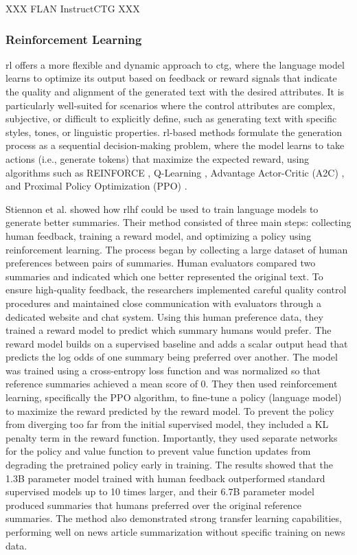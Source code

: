 XXX
FLAN
InstructCTG
XXX

\subsubsection{Reinforcement Learning}
\gls{rl} offers a more flexible and dynamic approach to \gls{ctg}, where the language model learns to optimize its output based on feedback or reward signals that indicate the quality and alignment of the generated text with the desired attributes. 
It is particularly well-suited for scenarios where the control attributes are complex, subjective, or difficult to explicitly define, such as generating text with specific styles, tones, or linguistic properties. 
\gls{rl}-based methods formulate the generation process as a sequential decision-making problem, where the model learns to take actions (i.e., generate tokens) that maximize the expected reward, using algorithms such as REINFORCE \cite{10.1007/BF00992696}, Q-Learning \cite{Watkins1992-pa}, Advantage Actor-Critic (A2C) \cite{mnih2016asynchronousmethodsdeepreinforcement}, and Proximal Policy Optimization (PPO) \cite{schulman2017proximalpolicyoptimizationalgorithms}.

Stiennon et al. \Cite{stiennon2022learningsummarizehumanfeedback} showed how \gls{rlhf} could be used to train language models to generate better summaries.
Their method consisted of three main steps: collecting human feedback, training a reward model, and optimizing a policy using reinforcement learning.
The process began by collecting a large dataset of human preferences between pairs of summaries. 
Human evaluators compared two summaries and indicated which one better represented the original text. To ensure high-quality feedback, the researchers implemented careful quality control procedures and maintained close communication with evaluators through a dedicated website and chat system.
Using this human preference data, they trained a reward model to predict which summary humans would prefer. 
The reward model builds on a supervised baseline and adds a scalar output head that predicts the log odds of one summary being preferred over another.
The model was trained using a cross-entropy loss function and was normalized so that reference summaries achieved a mean score of 0.
They then used reinforcement learning, specifically the PPO algorithm, to fine-tune a policy (language model) to maximize the reward predicted by the reward model. 
To prevent the policy from diverging too far from the initial supervised model, they included a KL penalty term in the reward function. 
Importantly, they used separate networks for the policy and value function to prevent value function updates from degrading the pretrained policy early in training.
The results showed that the 1.3B parameter model trained with human feedback outperformed standard supervised models up to 10 times larger, and their 6.7B parameter model produced summaries that humans preferred over the original reference summaries. 
The method also demonstrated strong transfer learning capabilities, performing well on news article summarization without specific training on news data.

